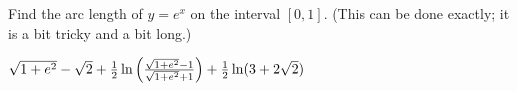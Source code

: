 \begin{exercises}
\begin{exercise} Find the arc length of $y=e^x$ on the interval $[0,1]$.
(This can be done exactly; it is a bit tricky and a bit long.)
\begin{answer} $\sqrt{1+e^2}-\sqrt2+
{1\over2}\ln\left({\sqrt{1+e^2}-1\over\sqrt{1+e^2}+1}\right)+
{1\over2}\ln(3+2\sqrt2)$
\end{answer}\end{exercise}

\end{exercises}

